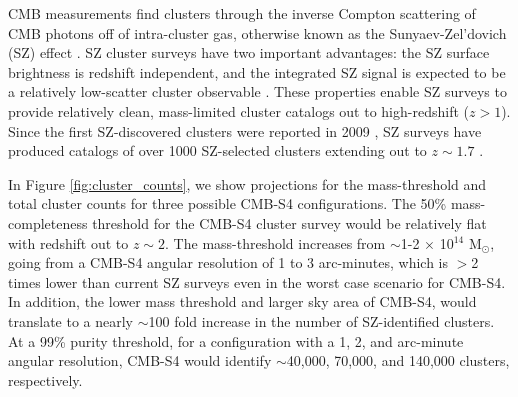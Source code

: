 CMB measurements find clusters through the inverse Compton scattering of CMB photons off of intra-cluster gas, otherwise 
known as the Sunyaev-Zel'dovich (SZ) effect \cite{Sunyaev:1972eq}. SZ cluster surveys have two important advantages: 
the SZ surface brightness is redshift independent, and the integrated SZ signal is expected to be a relatively 
low-scatter cluster observable \cite{Nagai:2005wx, Nagai:2007mt, Kravtsov:2012zs}.  These properties enable SZ surveys to provide 
relatively clean, mass-limited cluster catalogs out to high-redshift ($z > 1$).  Since the first SZ-discovered clusters were 
reported in 2009 \cite{Staniszewski:2008ma}, SZ surveys have produced catalogs of over 1000 SZ-selected clusters extending out to $z \sim 1.7$ 
\cite{Vanderlinde:2010eb, Reichardt:2012yj, Hasselfield:2013wf, Ade:2013skr, Bleem:2014iim, Ade:2015mva}.  



In Figure \ref{fig:cluster_counts}, we show projections for the mass-threshold and total cluster counts for three possible CMB-S4 configurations.  
The 50\% mass-completeness threshold for the CMB-S4 cluster survey would be relatively flat with redshift out to $z \sim 2$.  
The mass-threshold increases from $\sim$1-2 $\times$ 10$^{14}$ M$_{\odot}$, going from a CMB-S4 angular resolution 
of 1 to 3 arc-minutes, which is $>$2 times lower than current SZ surveys even in the worst case scenario for CMB-S4.  
In addition, the lower mass threshold and larger sky area of CMB-S4, would translate to a nearly $\sim$100 fold increase in the 
number of SZ-identified clusters.  At a 99\% purity threshold, for a configuration with a 1, 2, and arc-minute angular 
resolution, CMB-S4 would identify $\sim$40,000, 70,000, and 140,000 clusters, respectively.  


